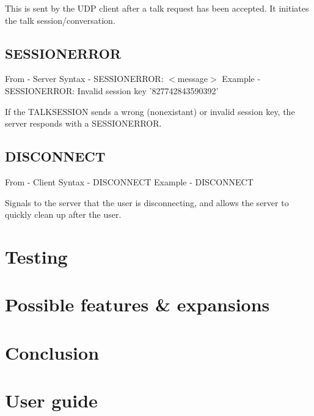 \documentclass[12pt]{rapport}
\begin{document}
\noindent This is sent by the UDP client after a talk request has been
accepted. It initiates the talk session/conversation.

\subsection*{SESSIONERROR}
From    - Server\newline
Syntax  - SESSIONERROR: $<$message$>$\newline
Example - SESSIONERROR: Invalid session key '827742843590392'\newline

\noindent If the TALKSESSION sends a wrong (nonexistant) or invalid
session key, the server responds with a SESSIONERROR.

\subsection*{DISCONNECT}
From    - Client\newline
Syntax  - DISCONNECT\newline
Example - DISCONNECT\newline

\noindent Signals to the server that the user is disconnecting, and
allows the server to quickly clean up after the user.


\section*{Testing}



\section*{Possible features \& expansions}



\newpage
\section*{Conclusion}




\newpage
\section*{User guide}
\end{document}

